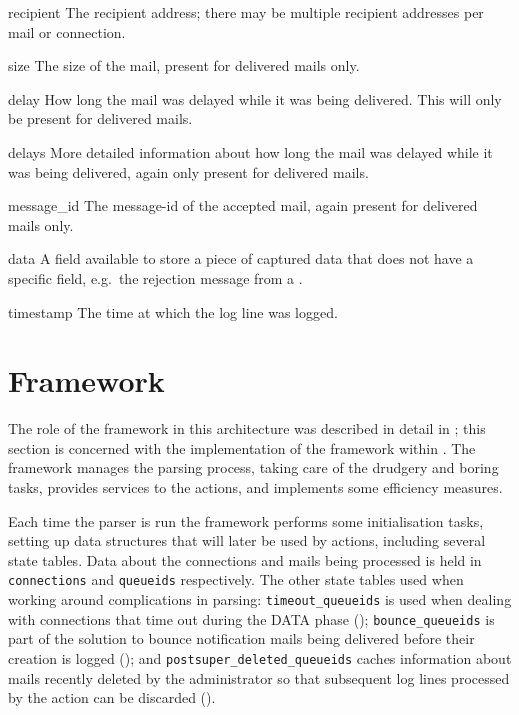 \begin{boldeqlist}
    \item [recipient] The recipient address; there may be multiple
        recipient addresses per mail or connection.

    \item [size] The size of the mail, present for delivered mails only.

    \item [delay] How long the mail was delayed while it was being
        delivered.  This will only be present for delivered mails.

    \item [delays] More detailed information about how long the mail was
        delayed while it was being delivered, again only present for
        delivered mails.

    \item [message\_id] The message-id of the accepted mail, again present
        for delivered mails only.

    \item [data] A field available to store a piece of captured data that
        does not have a specific field, e.g.\ the rejection message from a
        \@.

    \item [timestamp] The time at which the log line was logged.

\end{boldeqlist}



\section{Framework}

The role of the framework in this architecture was described in detail in
; this section is concerned with the
implementation of the framework within \parsername{}.  The framework
manages the parsing process, taking care of the drudgery and boring tasks,
provides services to the actions, and implements some efficiency measures.

Each time the parser is run the framework performs some initialisation
tasks, setting up data structures that will later be used by actions,
including several state tables.  Data about the connections and mails being
processed is held in \texttt{connections} and \texttt{queueids}
respectively.  The other state tables used when working around
complications in parsing: \texttt{timeout\_queueids} is used when dealing
with connections that time out during the DATA phase (); \texttt{bounce\_queueids} is part of the solution to
bounce notification mails being delivered before their creation is logged
(); and \texttt{postsuper\_deleted\_queueids} caches information
about mails recently deleted by the administrator so that subsequent log
lines processed by the  action can be discarded
().

